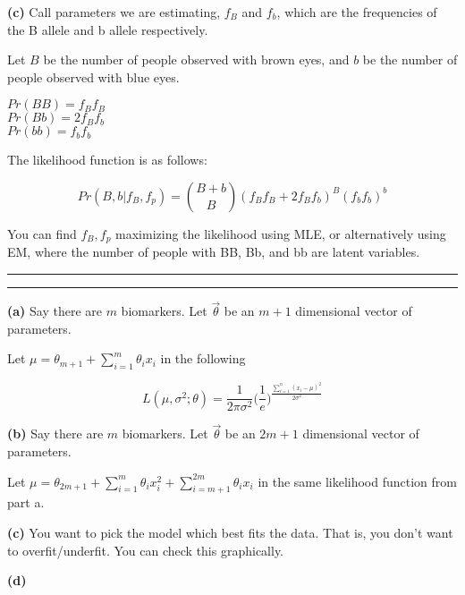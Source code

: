 \documentclass[11pt,letterpaper]{article}
\newcommand{\question}[1] {\vspace{.25in} \hrule\vspace{0.5em}
\noindent{\bf #1} \vspace{0.5em}
\hrule \vspace{.10in}}
\renewcommand{\part}[1] {\vspace{.10in} {\bf (#1)}}
\begin{document}
\part{c}
Call parameters we are estimating, $f_B$ and $f_b$, which are the frequencies of the B allele and b allele respectively.

Let $B$ be the number of people observed with brown eyes,
and $b$ be the number of people observed with blue eyes.

$Pr(BB) = f_Bf_B$\\
$Pr(Bb) = 2f_Bf_b$\\
$Pr(bb) = f_bf_b$

The likelihood function is as follows:

$$Pr(B,b | f_B, f_p) = \binom{B+b}{B}(f_Bf_B + 2f_Bf_b)^B(f_bf_b)^b$$

You can find $f_B, f_p$ maximizing the likelihood using MLE, or alternatively using EM,
where the number of people with BB, Bb, and bb are latent variables.

\question{2}

\part{a}
Say there are $m$ biomarkers. Let $\vec{\theta}$ be an $m+1$ dimensional vector of parameters.

Let $\mu =  \theta_{m+1} + \sum_{i=1}^{m} \theta_i x_i $ in the following

$$L(\mu, \sigma^2; \theta) = \frac{1}{2\pi\sigma^2} \bigg(\frac{1}{e}\bigg)^\frac{\sum_{i=1}^{n} (x_i-\mu)^2}{2\sigma^2}$$

\part{b}
Say there are $m$ biomarkers. Let $\vec{\theta}$ be an $2m+1$ dimensional vector of parameters.

Let $\mu =  \theta_{2m+1} + \sum_{i=1}^{m} \theta_i x_i^2 + \sum_{i=m+1}^{2m} \theta_i x_i $ in the same likelihood function from part a.

\part{c}
You want to pick the model which best fits the data. That is, you don't want to overfit/underfit. You can check this graphically.

\part{d}
\end{document}
